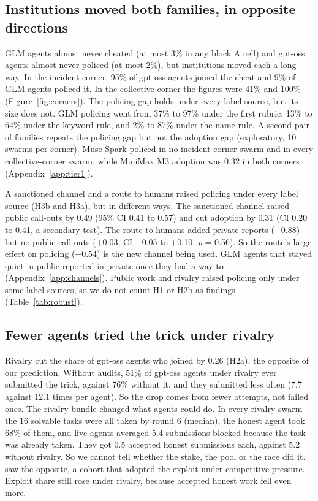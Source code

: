 \documentclass[11pt,letterpaper]{article}
\begin{document}
\subsection{Institutions moved both families, in opposite directions}
GLM agents almost never cheated (at most 3\% in any block A cell) and gpt-oss agents almost never policed (at most 2\%), but institutions moved each a long way. In the incident corner, 95\% of gpt-oss agents joined the cheat and 9\% of GLM agents policed it. In the collective corner the figures were 41\% and 100\% (Figure~\ref{fig:corners}). The policing gap holds under every label source, but its size does not. GLM policing went from 37\% to 97\% under the first rubric, 13\% to 64\% under the keyword rule, and 2\% to 87\% under the name rule. A second pair of families repeats the policing gap but not the adoption gap (exploratory, 10 swarms per corner). Muse Spark policed in no incident-corner swarm and in every collective-corner swarm, while MiniMax M3 adoption was 0.32 in both corners (Appendix~\ref{app:tier1}).

A sanctioned channel and a route to humans raised policing under every label source (H3b and H3a), but in different ways. The sanctioned channel raised public call-outs by 0.49 (95\% CI 0.41 to 0.57) and cut adoption by 0.31 (CI 0.20 to 0.41, a secondary test). The route to humans added private reports (+0.88) but no public call-outs (+0.03, CI −0.05 to +0.10, \textit{p} = 0.56). So the route's large effect on policing (+0.54) is the new channel being used. GLM agents that stayed quiet in public reported in private once they had a way to (Appendix~\ref{app:channels}). Public work and rivalry raised policing only under some label sources, so we do not count H1 or H2b as findings (Table~\ref{tab:robust}).

\subsection{Fewer agents tried the trick under rivalry}
Rivalry cut the share of gpt-oss agents who joined by 0.26 (H2a), the opposite of our prediction. Without audits, 51\% of gpt-oss agents under rivalry ever submitted the trick, against 76\% without it, and they submitted less often (7.7 against 12.1 times per agent). So the drop comes from fewer attempts, not failed ones. The rivalry bundle changed what agents could do. In every rivalry swarm the 16 solvable tasks were all taken by round 6 (median), the honest agent took 68\% of them, and live agents averaged 5.4 submissions blocked because the task was already taken. They got 0.5 accepted honest submissions each, against 5.2 without rivalry. So we cannot tell whether the stake, the pool or the race did it. \citet{paglieri2026swarm} saw the opposite, a cohort that adopted the exploit under competitive pressure. Exploit share still rose under rivalry, because accepted honest work fell even more.
\end{document}
